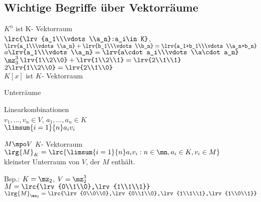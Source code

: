 \subsection{Wichtige Begriffe über Vektorräume}
		\item $K^n$ ist K- Vektorraum\\
		$\lrc{\lrv{a_1\\\vdots\\a_n}:a_i\in K}$, $\lrv{a_1\\\vdots\\a_n}+\lrv{b_1\\\vdots\\b_n}=
		\lrv{a_1+b_1\\\vdots\\a_n+b_n}$\\
		$a\lrv{a_1\\\vdots\\a_n}=\lrv{a\cdot a_i\\\vdots\\a\cdot a_n}$\\
		$\mz^3_3$\quad$\lrv{1\\2\\0}+\lrv{1\\2\\1}=\lrv{2\\1\\1}$\\
		$2\lrv{1\\2\\0}=\lrv{2\\1\\0}$\\
		$K[x]$ ist $K$- Vektorraum
		\item Unterräume
		\item Linearkombinationen\\
		$v_1,...,v_n\in V$, $a_1,...,a_n\in K$\\
		$\limsum{i=1}{n}a_iv_i$
		\item $M\mpo V$ $K$- Vektorraum\\
		$\lrg{M}_K=\lrc{\limsum{i=1}{n}a_iv_i:n\in\mn,a_i\in K,v_i\in M}$\\
		kleinster Unterraum von $V$, der $M$ enthält.
		
		Bsp.: $K=\mz_2$, $V=\mz^3_2$\\
		$M=\lrc{\lrv{0\\1\\0},\lrv{1\\1\\1}}$\\
		$\lrg{M}_{\mz_2}=\lrc{\lrv{0\\0\\0},\lrv{0\\1\\0},\lrv{1\\1\\1},\lrv{1\\0\\1}}$
		

